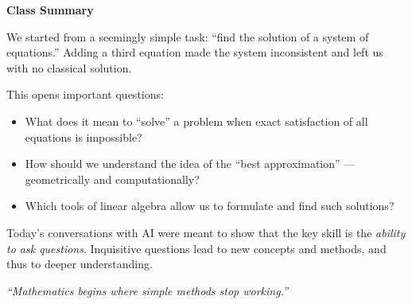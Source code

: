 \documentclass[12pt,a4paper]{article}
\begin{document}
\newpage
\begin{center}
\Large \textbf{Class Summary}
\end{center}

\bigskip

We started from a seemingly simple task: “find the solution of a system of equations.”  
Adding a third equation made the system inconsistent and left us with no classical solution.

This opens important questions:
\begin{itemize}
    \item What does it mean to “solve” a problem when exact satisfaction of all equations is impossible?
    \item How should we understand the idea of the “best approximation” --- geometrically and computationally?
    \item Which tools of linear algebra allow us to formulate and find such solutions?
\end{itemize}

Today’s conversations with AI were meant to show that the key skill is the \emph{ability to ask questions}.  
Inquisitive questions lead to new concepts and methods, and thus to deeper understanding.

\bigskip
\begin{center}
\textit{“Mathematics begins where simple methods stop working.”}
\end{center}
\end{document}
